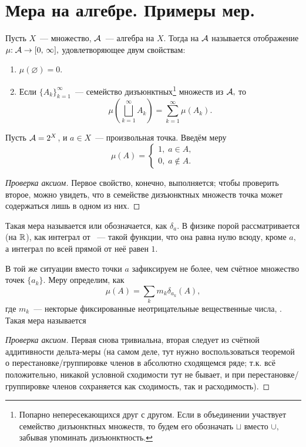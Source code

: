 \documentclass{notes}
\begin{document}
\section{Мера на алгебре. Примеры мер.}

	\begin{de}
		Пусть $X$~--- множество, $\mathcal{A}$~--- алгебра на $X$. Тогда  на $\mathcal{A}$ называется отображение $\mu \text{\text{:}} \; \mathcal{A} \to [0, \, \infty],$ удовлетворяющее двум свойствам:
		\begin{enumerate}
			\item $\mu(\varnothing) = 0.$
			\item Если $\{A_k\}_{k = 1}^{\infty}$~--- семейство дизъюнктных\footnote{Попарно непересекающихся друг с другом. Если в объединении участвует семейство дизъюнктных множеств, то будем его обозначать $\sqcup$ вместо $\cup,$ забывая упоминать дизъюнктность.} множеств из $\mathcal{A},$ то 
			\[
				\mu \left(\bigsqcup\limits_{k = 1}^{\infty} A_k\right) = \sum\limits_{k = 1}^{\infty} \mu(A_k).
			\]
		\end{enumerate}
	\end{de}

	\begin{exm}
		Пусть $\mathcal{A} = 2^{X}$, и $a \in X$~--- произвольная точка. Введём меру
		\[
			\mu(A) = \begin{cases}
				1, \; a \in A, \\
				0, \; a \notin A.
			\end{cases}
		\]
			\begin{proof}[Проверка аксиом]
				Первое свойство, конечно, выполняется; чтобы проверить второе, можно увидеть, что в семействе дизъюнктных множеств точка может содержаться лишь в одном из них. 
			\end{proof}
		Такая мера называется  или  обозначается, как $\delta_a$. В физике порой рассматривается (на $\mathbb{R}$), как интеграл от ~--- такой функции, что она равна нулю всюду, кроме $a,$ а интеграл по всей прямой от неё равен $1$.
	\end{exm}

	\begin{exm}
		В той же ситуации вместо точки $a$ зафиксируем не более, чем счётное множество точек $\{a_k\}$. Меру определим, как
		\[
			\mu(A) = \sum \limits_{k} m_k \delta_{a_k}(A),
		\]
		где $m_k$~--- некторые фиксированные неотрицательные вещественные числа, . Такая мера называется \ti{молекулярной.}
		\begin{proof}[Проверка аксиом]
			Первая снова тривиальна, вторая следует из счётной аддитивности дельта-меры (на самом деле, тут нужно воспользоваться теоремой о перестановке/группировке членов в абсолютно сходящемся ряде; т.к. всё положительно, никакой условной сходимости тут не бывает, и при перестановке/группировке членов сохраняется как сходимость, так и расходимость).
		\end{proof}
	\end{exm}
\end{document}
